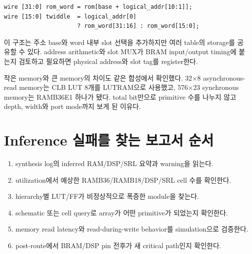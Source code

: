 \begin{lstlisting}
wire [31:0] rom_word = rom[base + logical_addr[10:1]];
wire [15:0] twiddle  = logical_addr[0]
                     ? rom_word[31:16] : rom_word[15:0];
\end{lstlisting}

이 구조는 주소 base와 word 내부 slot 선택을 추가하지만 여러 table의 storage를
공유할 수 있다. address arithmetic와 slot MUX가 BRAM input/output timing에 붙는지
검토하고 필요하면 physical address와 slot tag를 register한다.

작은 memory와 큰 memory의 차이도 같은 합성에서 확인했다. 32$\times$8
asynchronous-read memory는 CLB LUT 8개를 LUTRAM으로 사용했고,
576$\times$23 synchronous memory는 RAMB36E1 하나가 됐다. total bit만으로
primitive 수를 나누지 않고 depth, width와 port mode까지 보게 된 이유다.

\section{Inference 실패를 찾는 보고서 순서}

\begin{checklistbox}
\begin{enumerate}
  \item synthesis log의 inferred RAM/DSP/SRL 요약과 warning을 읽는다.
  \item utilization에서 예상한 RAMB36/RAMB18/DSP/SRL cell 수를 확인한다.
  \item hierarchy별 LUT/FF가 비정상적으로 폭증한 module을 찾는다.
  \item schematic 또는 cell query로 array가 어떤 primitive가 되었는지 확인한다.
  \item memory read latency와 read-during-write behavior를 simulation으로 검증한다.
  \item post-route에서 BRAM/DSP pin 전후가 새 critical path인지 확인한다.
\end{enumerate}
\end{checklistbox}
